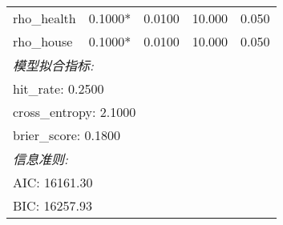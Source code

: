 \begin{table}[htbp]
\begin{tabular}{lcccc}
rho_health & 0.1000* & 0.0100 & 10.000 & 0.050 \\
rho_house & 0.1000* & 0.0100 & 10.000 & 0.050 \\
\midrule
\multicolumn{5}{l}{\textit{模型拟合指标:}} \\
\multicolumn{5}{l}{\quad hit_rate: 0.2500} \\
\multicolumn{5}{l}{\quad cross_entropy: 2.1000} \\
\multicolumn{5}{l}{\quad brier_score: 0.1800} \\
\multicolumn{5}{l}{\textit{信息准则:}} \\
\multicolumn{5}{l}{\quad AIC: 16161.30} \\
\multicolumn{5}{l}{\quad BIC: 16257.93} \\
\bottomrule
\end{tabular}
\end{table}
